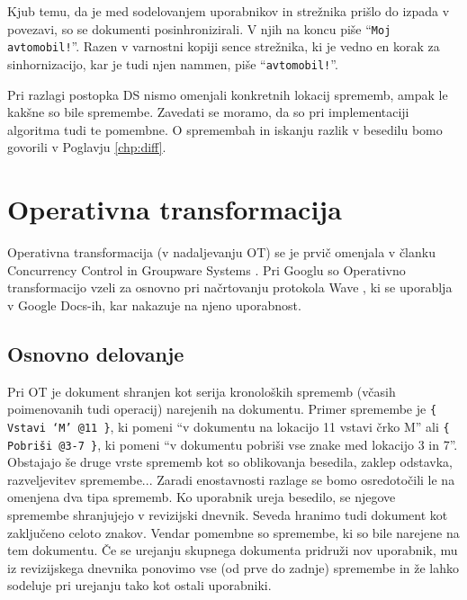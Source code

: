 \documentclass[a4paper, 12pt, twoside]{book}
\begin{document}
Kjub temu, da je med sodelovanjem uporabnikov in strežnika prišlo do izpada v povezavi, so se dokumenti posinhronizirali. V njih na koncu piše “{\tt Moj avtomobil!}”. Razen v varnostni kopiji sence strežnika, ki je vedno en korak za sinhornizacijo, kar je tudi njen nammen, piše “{\tt avtomobil!}”.

Pri razlagi postopka DS nismo omenjali konkretnih lokacij sprememb, ampak le kakšne so bile spremembe. Zavedati se moramo, da so pri implementaciji algoritma tudi te pomembne. O spremembah in iskanju razlik v besedilu bomo govorili v Poglavju \ref{chp:diff}.

\newpage

\section{Operativna transformacija}
\label{sec:ot}

Operativna transformacija (v nadaljevanju OT) se je prvič omenjala v članku Concurrency Control in Groupware Systems \cite{ccigs}. Pri Googlu so Operativno transformacijo vzeli za osnovno pri načrtovanju protokola Wave \cite{wave-ot}, ki se uporablja v Google Docs-ih, kar nakazuje na njeno uporabnost.

\subsection{Osnovno delovanje}

Pri OT je dokument shranjen kot serija kronoloških sprememb (včasih poimenovanih tudi operacij) narejenih na dokumentu. Primer spremembe je {\tt \{ Vstavi ‘M’ @11 \}}, ki pomeni “v dokumentu na lokacijo 11 vstavi črko M” ali {\tt \{ Pobriši @3-7 \}}, ki pomeni “v dokumentu pobriši vse znake med lokacijo 3 in 7”. Obstajajo še druge vrste sprememb kot so oblikovanja besedila, zaklep odstavka, razveljevitev spremembe... Zaradi enostavnosti razlage se bomo osredotočili le na omenjena dva tipa sprememb. Ko uporabnik ureja besedilo, se njegove spremembe shranjujejo v revizijski dnevnik. Seveda hranimo tudi dokument kot zaključeno celoto znakov. Vendar pomembne so spremembe, ki so bile narejene na tem dokumentu. Če se urejanju skupnega dokumenta pridruži nov uporabnik, mu iz revizijskega dnevnika ponovimo vse (od prve do zadnje) spremembe in že lahko sodeluje pri urejanju tako kot ostali uporabniki.
\end{document}
